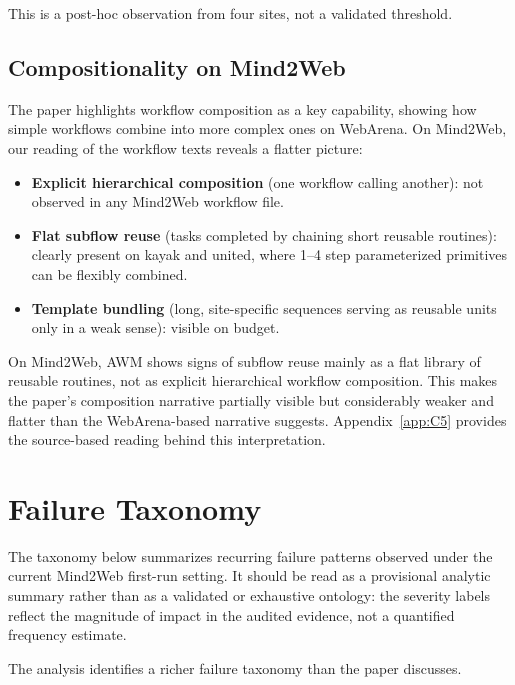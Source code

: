 \documentclass{article}
\providecommand{\tightlist}{%
  \setlength{\itemsep}{0pt}\setlength{\parskip}{0.8em}}
\begin{document}
This is a post-hoc observation from four sites, not a validated
threshold.

\subsection{Compositionality on
Mind2Web}\label{compositionality-on-mind2web}

The paper highlights workflow composition as a key capability, showing
how simple workflows combine into more complex ones on WebArena. On
Mind2Web, our reading of the workflow texts reveals a flatter picture:

\begin{itemize}
\tightlist
\item
  \textbf{Explicit hierarchical composition} (one workflow calling
  another): not observed in any Mind2Web workflow file.
\item
  \textbf{Flat subflow reuse} (tasks completed by chaining short
  reusable routines): clearly present on kayak and united, where 1--4
  step parameterized primitives can be flexibly combined.
\item
  \textbf{Template bundling} (long, site-specific sequences serving as
  reusable units only in a weak sense): visible on budget.
\end{itemize}

On Mind2Web, AWM shows signs of subflow reuse mainly as a flat library
of reusable routines, not as explicit hierarchical workflow composition.
This makes the paper's composition narrative partially visible but
considerably weaker and flatter than the WebArena-based narrative
suggests. Appendix~\ref{app:C5} provides the
source-based reading behind this interpretation.

\section{Failure Taxonomy}\label{failure-taxonomy}

The taxonomy below summarizes recurring failure patterns observed under
the current Mind2Web first-run setting. It should be read as a
provisional analytic summary rather than as a validated or exhaustive
ontology: the severity labels reflect the magnitude of impact in the
audited evidence, not a quantified frequency estimate.

The analysis identifies a richer failure taxonomy than the paper
discusses.
\end{document}
